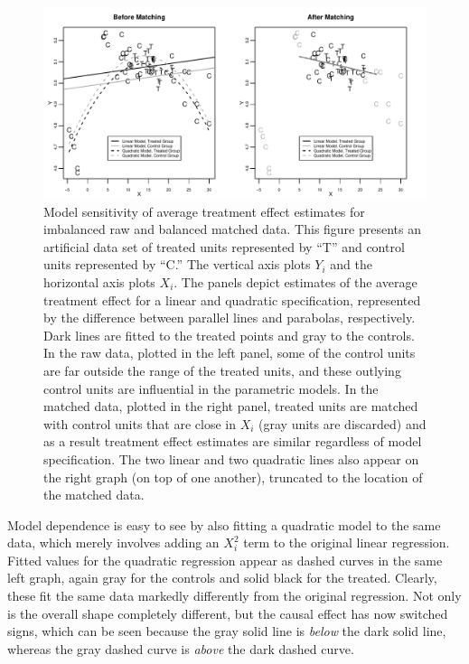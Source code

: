 \documentclass[11pt,titlepage]{article}
\begin{document}
\begin{figure}[t] 
 \begin{center}
   \includegraphics[width=6in]{figs/olspanel-sept06.pdf}
  \end{center}
  \vspace{-0.275in}
  \caption{Model sensitivity of average treatment effect estimates for
    imbalanced raw and balanced matched data.  This figure presents an
    artificial data set of treated units represented by ``T'' and
    control units represented by ``C.'' The vertical axis plots $Y_i$
    and the horizontal axis plots $X_i$.  The panels depict estimates
    of the average treatment effect for a linear and quadratic
    specification, represented by the difference between parallel
    lines and parabolas, respectively.  Dark lines are fitted to the
    treated points and gray to the controls.  In the raw data, plotted
    in the left panel, some of the control units are far outside the
    range of the treated units, and these outlying control units are
    influential in the parametric models.  In the matched data,
    plotted in the right panel, treated units are matched with control
    units that are close in $X_i$ (gray units are discarded) and as a
    result treatment effect estimates are similar regardless of model
    specification.  The two linear and two quadratic lines also appear
    on the right graph (on top of one another), truncated to the
    location of the matched data.}
  \label{fg:extrap}
\end{figure}

Model dependence is easy to see by also fitting a quadratic model to
the same data, which merely involves adding an $X_i^2$ term to the
original linear regression.  Fitted values for the quadratic
regression appear as dashed curves in the same left graph, again gray
for the controls and solid black for the treated.  Clearly, these fit
the same data markedly differently from the original regression.  Not
only is the overall shape completely different, but the causal effect
has now switched signs, which can be seen because the gray solid line
is \emph{below} the dark solid line, whereas the gray dashed curve is
\emph{above} the dark dashed curve.
\end{document}
